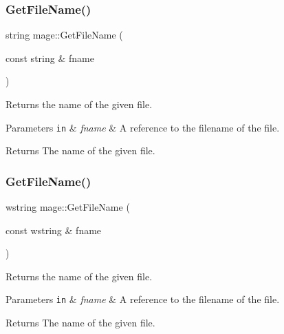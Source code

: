\subsubsection{\texorpdfstring{Get\+File\+Name()}{GetFileName()}\hspace{0.1cm}{\footnotesize\ttfamily [1/2]}}
{\footnotesize\ttfamily string mage\+::\+Get\+File\+Name (\begin{DoxyParamCaption}\item[{const string \&}]{fname }\end{DoxyParamCaption})}

Returns the name of the given file.


\begin{DoxyParams}[1]{Parameters}
\mbox{\tt in}  & {\em fname} & A reference to the filename of the file. \\
\hline
\end{DoxyParams}
\begin{DoxyReturn}{Returns}
The name of the given file. 
\end{DoxyReturn}
\hypertarget{namespacemage_a04f348f48418c554940a817835b7a0c4}{}\label{namespacemage_a04f348f48418c554940a817835b7a0c4} 
\subsubsection{\texorpdfstring{Get\+File\+Name()}{GetFileName()}\hspace{0.1cm}{\footnotesize\ttfamily [2/2]}}
{\footnotesize\ttfamily wstring mage\+::\+Get\+File\+Name (\begin{DoxyParamCaption}\item[{const wstring \&}]{fname }\end{DoxyParamCaption})}

Returns the name of the given file.


\begin{DoxyParams}[1]{Parameters}
\mbox{\tt in}  & {\em fname} & A reference to the filename of the file. \\
\hline
\end{DoxyParams}
\begin{DoxyReturn}{Returns}
The name of the given file. 
\end{DoxyReturn}
\hypertarget{namespacemage_ac5c99281501e7af99e9fd0c332f0e113}{}\label{namespacemage_ac5c99281501e7af99e9fd0c332f0e113} 
